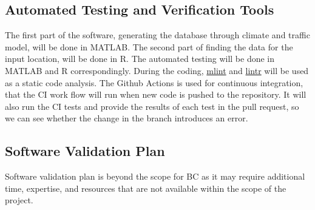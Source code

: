 \documentclass[12pt, titlepage]{article}
\begin{document}

\subsection{Automated Testing and Verification Tools}\label{ATVT}
The first part of the software, generating the database through climate and traffic model, will be done in MATLAB. The second part of finding the data for the input location, will be done in R. The automated testing will be done in MATLAB and R correspondingly. During the coding, \href{https://www.mathworks.com/help/matlab/ref/mlint.html}{mlint} and \href{https://lintr.r-lib.org/}{lintr} will be used as a static code analysis. The Github Actions is used for continuous integration, that the CI work flow will run when new code is pushed to the repository. It will also run the CI tests and provide the results of each test in the pull request, so we can see whether the change in the branch introduces an error.



\subsection{Software Validation Plan}\label{SVP}
Software validation plan is beyond the scope for BC as it may require additional time, expertise, and resources that are not available within the scope of the project. 
\end{document}
